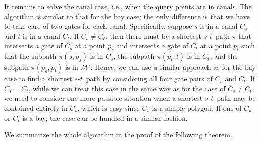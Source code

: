 \documentclass[english,runningheads,11pt]{llncs}
\def\calM{\mathcal{M}}
\def\st{$s$-$t$}
\begin{document}
It remains to solve the canal case, i.e., when the query points are
in canals. The algorithm is similar to that for the bay case; the only
difference is that we have to take care of two gates for each
canal. Specifically, suppose $s$ is in a canal $C_s$ and $t$ is
in a canal $C_t$. If $C_s\neq C_t$, then there must be a shortest \st\ path
$\pi$ that intersects a gate of $C_s$ at a point $p_s$ and intersects a gate of
$C_t$ at a point $p_t$ such that the subpath $\pi(s,p_s)$ is in $C_s$,
the subpath $\pi(p_t,t)$ is in $C_t$, and the subpath $\pi(p_s,p_t)$
is in $\calM'$. Hence, we can use a similar approach as for the bay case to
find a shortest \st\ path by considering all four gate pairs of $C_s$ and
$C_t$. If $C_s=C_t$, while we can treat this case in the same way as for
the case of $C_s\neq C_t$, we need to consider one more possible situation when
a shortest \st\ path may be contained entirely in $C_s$, which is easy since $C_s$
is a simple polygon. If one of $C_s$ or $C_t$ is a bay, the case can be handled
in a similar fashion.

We summarize the whole algorithm in the proof of the following theorem.
\end{document}
